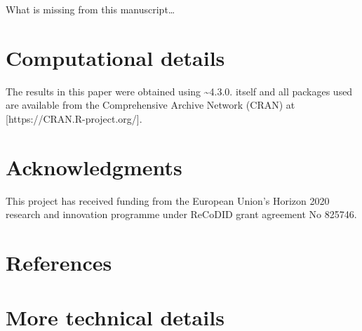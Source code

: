 \documentclass[
  article]{jss}
\begin{document}
What is missing from this manuscript\ldots{}

\hypertarget{computational-details}{%
\section*{Computational details}\label{computational-details}}

The results in this paper were obtained using
\textasciitilde4.3.0.  itself and all packages
used are available from the Comprehensive  Archive Network
(CRAN) at {[}https://CRAN.R-project.org/{]}.

\hypertarget{acknowledgments}{%
\section*{Acknowledgments}\label{acknowledgments}}

This project has received funding from the European Union's Horizon 2020
research and innovation programme under ReCoDID grant agreement No
825746.

\hypertarget{references}{%
\section*{References}\label{references}}

\renewcommand{\bibsection}{}


\newpage{}

\hypertarget{sec-techdetails}{%
\section*{More technical details}\label{sec-techdetails}}
\end{document}
